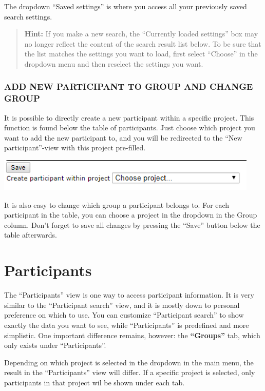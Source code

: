 \documentclass[
]{book}
\begin{document}
The dropdown ``Saved settings'' is where you access all your previously saved search settings.

\begin{quote}
\textbf{Hint:} If you make a new search, the ``Currently loaded settings'' box may no longer reflect the content of the search result list below. To be sure that the list matches the settings you want to load, first select ``Choose'' in the dropdown menu and then reselect the settings you want.
\end{quote}

\subsection{ADD NEW PARTICIPANT TO GROUP AND CHANGE GROUP}\label{add-new-participant-to-group-and-change-group}

It is possible to directly create a new participant within a specific project. This function is found below the table of participants. Just choose which project you want to add the new participant to, and you will be redirected to the ``New participant''-view with this project pre-filled.

\includegraphics{images/add-new-participants.png}

It is also easy to change which group a participant belongs to. For each participant in the table, you can choose a project in the dropdown in the Group column. Don't forget to save all changes by pressing the ``Save'' button below the table afterwards.

\chapter{Participants}\label{participants}

The ``Participants'' view is one way to access participant information. It is very similar to the ``Participant search'' view, and it is mostly down to personal preference on which to use. You can customize ``Participant search'' to show exactly the data you want to see, while ``Participants'' is predefined and more simplistic. One important difference remains, however: the \textbf{``Groups''} tab, which only exists under ``Participants''.

Depending on which project is selected in the dropdown in the main menu, the result in the ``Participants'' view will differ. If a specific project is selected, only participants in that project wil be shown under each tab.
\end{document}
